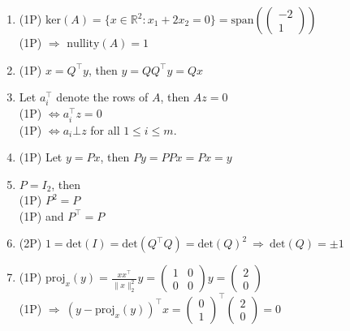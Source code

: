 {\color{solution}
\begin{enumerate}
	\item\textcolor{exampoints}{(1P)}  $\text{ker}(A)=\{x\in\mathbb{R}^2\colon x_1 +2x_2= 0\}=\text{span}(\begin{pmatrix}
	-2\\1
	\end{pmatrix})$\\
	\textcolor{exampoints}{(1P)} $\Rightarrow$ $\text{nullity}(A)=1$
	\item \textcolor{exampoints}{(1P)} $x = Q^\top y$, then $y=QQ^\top y =Qx $
	\item  Let $a_i^\top$ denote the rows of $A$, then $Az = 0$\\
	 \textcolor{exampoints}{(1P)}  $\iff a_i^\top z = 0$\\
	 \textcolor{exampoints}{(1P)}  $ \iff a_i \bot z$ for all $1\leq i \leq m$.
	\item \textcolor{exampoints}{(1P)} Let $y= Px$, then $Py = PPx = Px = y$
	\item  $P= I_2$, then\\
	 \textcolor{exampoints}{(1P)} $P^2 = P$\\
	 \textcolor{exampoints}{(1P)}  and $P^\top = P$
	\item \textcolor{exampoints}{(2P)} $1 = \text{det}(I) = \text{det}(Q^\top Q)=\text{det}(Q)^2 ~\Rightarrow~\text{det}(Q)=\pm 1$
	\item \textcolor{exampoints}{(1P)}  $\text{proj}_x(y) = \frac{xx^\top}{\|x\|^2_2}  y= \begin{pmatrix}
	 1 &0\\0&0
	\end{pmatrix}y = \begin{pmatrix}
	2 \\0
	\end{pmatrix}$\\
	\textcolor{exampoints}{(1P)} $ \Rightarrow~(y - \text{proj}_x(y))^\top x = \begin{pmatrix}
	0 \\1
	\end{pmatrix}^\top\begin{pmatrix}
	2 \\0
	\end{pmatrix}=0$

\end{enumerate}
}

